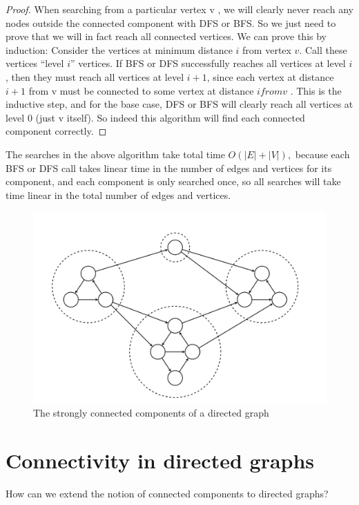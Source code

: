 \documentclass [12pt]{article}
\theoremstyle{definition}
\begin{document}
\begin{proof}
When searching from a particular vertex v , we will clearly never reach any nodes outside the connected component with DFS or BFS. So we just need to prove that we will in fact reach all connected vertices. We can prove this by induction: Consider the vertices at minimum distance $i$ from vertex $v$. Call these vertices ``level $i$'' vertices. If BFS or DFS successfully reaches all vertices at level $i$, then they must reach all vertices at level $i + 1$, since each vertex at distance $i + 1$ from v must be connected to some vertex at distance $i from v$ . This is the inductive step, and for the base case, DFS or BFS will clearly reach all vertices at level $0$ (just v itself). So indeed this algorithm will find each connected component correctly.
\end{proof}

The searches in the above algorithm take total time $O(|E| + |V |),$ because each BFS or DFS call takes linear time in the number of edges and vertices for its component, and each component is only searched once, so all searches will take time linear in the total number of edges and vertices.

\begin{figure}[ht!]
\centering
\includegraphics[scale=0.5]{scc_graph.png}
\caption{The strongly connected components of a directed graph}
\label{fig:scc_graph}
\end{figure}

\section{Connectivity in directed graphs}
How can we extend the notion of connected components to directed graphs?
\end{document}
